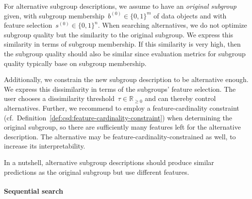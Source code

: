 \documentclass{article}
\theoremstyle{definition}
\begin{document}
For alternative subgroup descriptions, we assume to have an \emph{original subgroup} given, with subgroup membership~$b^{(0)} \in \{0, 1\}^m$ of data objects and with feature selection~$s^{(0)} \in \{0, 1\}^n$.
When searching alternatives, we do not optimize subgroup quality but the similarity to the original subgroup.
We express this similarity in terms of subgroup membership.
If this similarity is very high, then the subgroup quality should also be similar since evaluation metrics for subgroup quality typically base on subgroup membership.

Additionally, we constrain the new subgroup description to be alternative enough.
We express this dissimilarity in terms of the subgroups' feature selection.
The user chooses a dissimilarity threshold~$\tau \in \mathbb{R}_{\geq 0}$ and can thereby control alternatives.
Further, we recommend to employ a feature-cardinality constraint (cf.~Definition~\ref{def:csd:feature-cardinality-constraint}) when determining the original subgroup, so there are sufficiently many features left for the alternative description.
The alternative may be feature-cardinality-constrained as well, to increase its interpretability.

In a nutshell, alternative subgroup descriptions should produce similar predictions as the original subgroup but use different features.

\paragraph{Sequential search}
\end{document}
